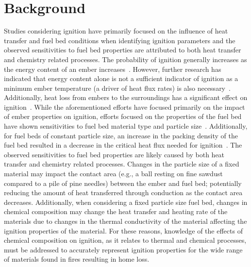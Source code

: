 \section{Background}
\label{sec:background3}
    Studies considering ignition have primarily focused on the influence of heat transfer and fuel bed conditions when identifying ignition parameters and the observed sensitivities to fuel bed properties are attributed to both heat transfer and chemistry related processes. The probability of ignition generally increases as the energy content of an ember increases~\cite{Hadden2011}. However, further research has indicated that energy content alone is not a sufficient indicator of ignition as a minimum ember temperature (a driver of heat flux rates) is also necessary~\cite{Zak2014}. Additionally, heat loss from embers to the surroundings has a significant effect on ignition~\cite{Fernandez-Pello2015}. While the aforementioned efforts have focused primarily on the impact of ember properties on ignition, efforts focused on the properties of the fuel bed have shown sensitivities to fuel bed material type and particle size~\cite{Urban2018}. Additionally, for fuel beds of constant particle size, an increase in the packing density of the fuel bed resulted in a decrease in the critical heat flux needed for ignition~\cite{Mindykowski2011, Hernandez2018, Rivera2020}. The observed sensitivities to fuel bed properties are likely caused by both heat transfer and chemistry related processes. Changes in the particle size of a fixed material may impact the contact area (e.g., a ball resting on fine sawdust compared to a pile of pine needles) between the ember and fuel bed; potentially reducing the amount of heat transferred through conduction as the contact area decreases. Additionally, when considering a fixed particle size fuel bed, changes in chemical composition may change the heat transfer and heating rate of the materials due to changes in the thermal conductivity of the material affecting the ignition properties of the material. For these reasons, knowledge of the effects of chemical composition on ignition, as it relates to thermal and chemical processes, must be addressed to accurately represent ignition properties for the wide range of materials found in fires resulting in home loss.

